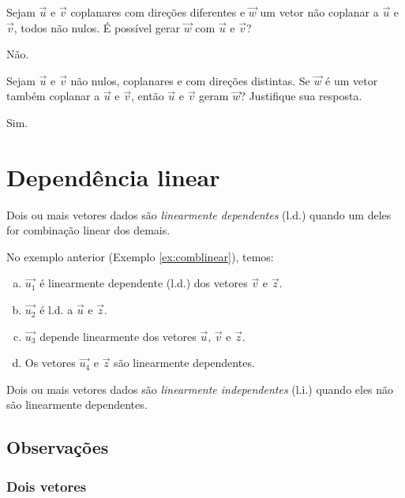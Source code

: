 \begin{exer}
  Sejam $\vec{u}$ e $\vec{v}$ coplanares com direções diferentes e $\vec{w}$ um vetor não coplanar a $\vec{u}$ e $\vec{v}$, todos não nulos. É possível gerar $\vec{w}$ com $\vec{u}$ e $\vec{v}$?
\end{exer}
\begin{resp}
  Não.
\end{resp}

\begin{exer}
  Sejam $\vec{u}$ e $\vec{v}$ não nulos, coplanares e com direções distintas. Se $\vec{w}$ é um vetor também coplanar a $\vec{u}$ e $\vec{v}$, então $\vec{u}$ e $\vec{v}$ geram $\vec{w}$? Justifique sua resposta.
\end{exer}
\begin{resp}
  Sim.
\end{resp}

\section{Dependência linear}\label{cap_base_sec_deplinear}
\badgeRevisar

Dois ou mais vetores dados são \emph{linearmente dependentes} (l.d.) quando um deles for combinação linear dos demais.

\begin{ex}\label{ex:deplinear}
  No exemplo anterior (Exemplo \ref{ex:comblinear}), temos:
  \begin{enumerate}[a)]
  \item $\vec{u_1}$ é linearmente dependente (l.d.) dos vetores $\vec{v}$ e $\vec{z}$.
  \item $\vec{u_2}$ é l.d. a $\vec{u}$ e $\vec{z}$.
  \item $\vec{u_3}$ depende linearmente dos vetores $\vec{u}$, $\vec{v}$ e $\vec{z}$.
  \item Os vetores $\vec{u_4}$ e $\vec{z}$ são linearmente dependentes.
  \end{enumerate}
\end{ex}

Dois ou mais vetores dados são \emph{linearmente independentes} (l.i.) quando eles não são linearmente dependentes.

\subsection{Observações}\label{cap_base_sec_deplin_subsec_obs}

\subsubsection{Dois vetores}

